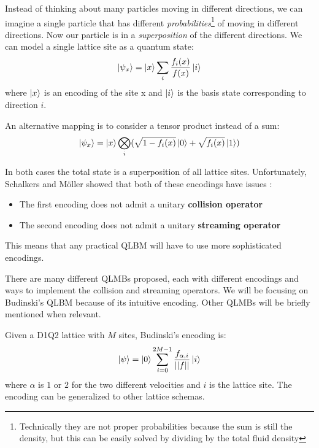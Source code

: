 \documentclass[conference]{IEEEtran}
\begin{document}
Instead of thinking about many particles moving in different directions, we can imagine a single particle that has different \emph{probabilities}\footnote{Technically they are not proper probabilities because the sum is still the density, but this can be easily solved by dividing by the total fluid density} of moving in different directions.
Now our particle is in a \emph{superposition} of the different directions. We can model a single lattice site as a quantum state:
\begin{displaymath}
    \label{eq:qlbm}
    \ket{\psi_x} = \ket{x}\sum_{i} \frac{f_{i}(x)}{f(x)} \ket{i}
\end{displaymath}
where $\ket{x}$ is an encoding of the site x and $\ket{i}$ is the basis state corresponding to direction $i$.

An alternative mapping is to consider a tensor product instead of a sum:
\begin{displaymath}
    \label{eq:qlbm2}
    \ket{\psi_x} = \ket{x}\bigotimes_{i} (\sqrt{1-f_i(x)}\ket{0} + \sqrt{f_i(x)}\ket{1})
\end{displaymath}

In both cases the total state is a superposition of all lattice sites.
Unfortunately, Schalkers and Möller showed that both of these encodings have issues \cite{schalkers2024importance}:
\begin{itemize}
    \item The first encoding does not admit a unitary \textbf{collision operator}
    \item The second encoding does not admit a unitary \textbf{streaming operator}
\end{itemize}

This means that any practical QLBM will have to use more sophisticated encodings.

There are many different QLMBs proposed, each with different encodings and ways to implement the collision and streaming operators.
We will be focusing on Budinski's QLBM \cite{budinski2021quantum} because of its intuitive encoding.
Other QLMBs will be briefly mentioned when relevant.

Given a D1Q2 lattice with $M$ sites, Budinski's encoding is:
\begin{displaymath}
    \label{eq:qlbm3}
    \ket{\psi} = \ket{0} \sum_{i=0}^{2M-1} \frac{f_{\alpha, i}}{||f||}\ket{i} 
\end{displaymath}
where $\alpha$ is $1$ or $2$ for the two different velocities and $i$ is the lattice site.
The encoding can be generalized to other lattice schemas.
\end{document}
